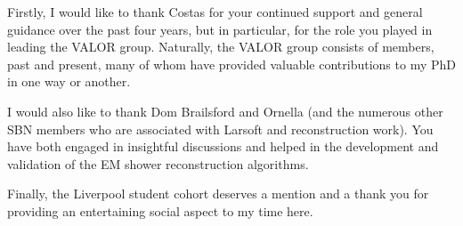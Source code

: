 \setabstractextramargins{0cm}


\glsaddall 
\glsunsetall

\setdeclarationextramargins{0cm}


\begin{acknowledgements}
    
  Firstly, I would like to thank Costas for your continued support and general guidance over the past four years, but in particular, for the role you played in leading the VALOR group. Naturally, the VALOR group consists of members, past and present, many of whom have provided valuable contributions to my PhD in one way or another. 
  
  I would also like to thank Dom Brailsford and Ornella (and the numerous other SBN members who are associated with Larsoft and reconstruction work). You have both engaged in insightful discussions and helped in the development and validation of the EM shower reconstruction algorithms. 

  Finally, the Liverpool student cohort deserves a mention and a thank you for providing an entertaining social aspect to my time here. 

\end{acknowledgements}


\setcounter{tocdepth}{3}
\setcounter{secnumdepth}{3}
\tableofcontents



\thispagestyle{empty}


\printglossaries

\glsunsetall


\renewcommand{\listfigurename}{List of Figures}
\renewcommand{\listtablename}{List of Tables}

\listoffigures
\listoftables

\glsresetall



